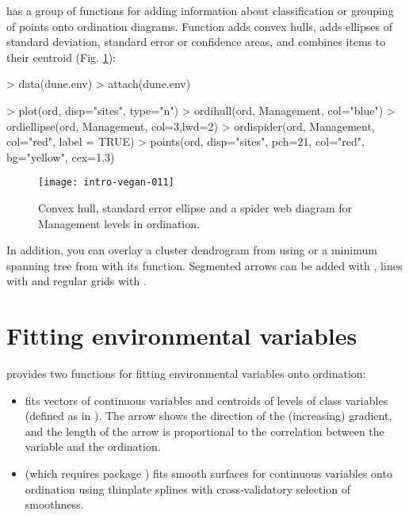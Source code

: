 \documentclass[a4paper,10pt]{article}
\begin{document}
 has a group of functions for adding information about
classification or grouping of points onto ordination diagrams.
Function  adds convex hulls, 
adds ellipses of standard deviation, standard error or confidence
areas, and  combines items to their centroid
(Fig. \ref{fig:ordihull}):
\begin{Schunk}
\begin{Sinput}
> data(dune.env)
> attach(dune.env)
\end{Sinput}
\end{Schunk}
\begin{Schunk}
\begin{Sinput}
> plot(ord, disp="sites", type="n")
> ordihull(ord, Management, col="blue")
> ordiellipse(ord, Management, col=3,lwd=2)
> ordispider(ord, Management, col="red", label = TRUE)
> points(ord, disp="sites", pch=21, col="red", bg="yellow", cex=1.3)
\end{Sinput}
\end{Schunk}
\begin{figure}
\texttt{[image: intro-vegan-011]}
\caption{Convex hull, standard error ellipse and a spider web diagram
  for Management levels in ordination.}
\label{fig:ordihull}
\end{figure}
In addition, you can overlay a cluster dendrogram from 
using  or a minimum spanning tree from
 with its  function.  Segmented arrows
can be added with , lines with
 and regular grids with .

\section{Fitting environmental variables}

 provides two functions for fitting environmental
variables onto ordination:
\begin{itemize}
\item {} fits vectors of continuous variables and centroids
  of levels of class variables (defined as  in
  ).  The arrow shows the direction of the (increasing)
  gradient, and the length of the arrow is proportional to the
  correlation between the variable and the ordination.
\item {} (which requires package ) fits
  smooth surfaces for continuous variables onto ordination using
  thinplate splines with cross-validatory selection of smoothness.
\end{itemize}
\end{document}
